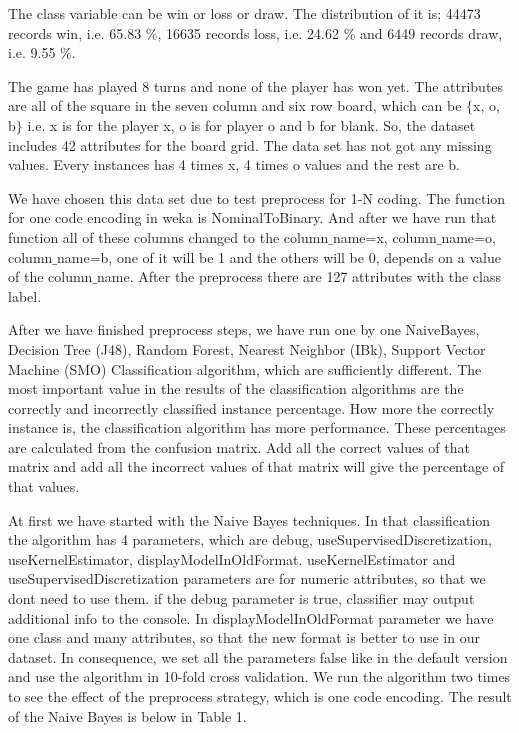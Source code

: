 \documentclass[a4paper]{article}
\begin{document}
The class variable can be win or loss or draw. The distribution of it is; 44473 records win, i.e. 65.83 $\%$, 16635 records loss,  i.e. 24.62 $\%$ and 6449 records draw,  i.e. 9.55 $\%$.

The game has played 8 turns and none of the player has won yet. The attributes are all of the square in the seven column and six row board, which can be $\{$x, o, b$\}$ i.e. x is for the player x, o is for player o and b for blank. So, the dataset includes 42 attributes for the board grid. The data set has not got any missing values. Every instances has 4 times x, 4 times o values and the rest are b. 

We have chosen this data set due to test preprocess for 1-N coding. The function for one code encoding in weka is NominalToBinary. And after we have run that function all of these columns changed to the column$\_$name=x, column$\_$name=o, column$\_$name=b, one of it will be 1 and the others will be 0, depends on a value of the column$\_$name. After the preprocess there are 127 attributes with the class label. 

After we have finished preprocess steps, we have run one by one NaiveBayes, Decision Tree (J48), Random Forest, Nearest Neighbor (IBk), Support Vector Machine (SMO) Classification algorithm, which are sufficiently different. The most important value in the results of the classification algorithms are the correctly and incorrectly classified instance percentage. How more the correctly instance is, the classification algorithm has more performance. These percentages are calculated from the confusion matrix. Add all the correct values of that matrix and add all the incorrect values of that matrix will give the percentage of that values. 

At first we have started with the Naive Bayes techniques. In that classification the algorithm has 4 parameters, which are debug, useSupervisedDiscretization, useKernelEstimator, displayModelInOldFormat. useKernelEstimator and useSupervisedDiscretization parameters are for numeric attributes, so that we dont need to use them. if the debug parameter is true, classifier may output additional info to the console. In displayModelInOldFormat parameter we have one class and many attributes, so that the new format is better to use in our dataset. In consequence, we set all the parameters false like in the default version and use the algorithm in 10-fold cross validation. We run the algorithm two times to see the effect of the preprocess strategy, which is one code encoding. The result of the Naive Bayes is below in Table 1.
\end{document}
